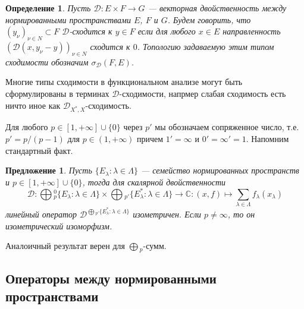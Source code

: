 \documentclass[12pt]{article}
\newtheorem{proposition}[theorem]{Предложение}
\newtheorem{definition}[theorem]{Определение}
\begin{document}
\begin{definition} Пусть $\mathcal{D}:E\times F\to G$ --- векторная двойственность между нормированными пространствами $E$, $F$ и $G$. Будем говорить, что $(y_\nu)_{\nu\in N}\subset F$ $\mathcal{D}$-сходится к $y\in F$ если для любого $x\in E$ направленность $(\mathcal{D}(x,y_\nu-y))_{\nu\in N}$ сходится к $0$. Топологию задаваемую этим типом сходимости обозначим $\sigma_\mathcal{D}(F,E)$.
\end{definition}

Многие типы сходимости в функциональном анализе могут быть сформулированы в терминах $\mathcal{D}$-сходимости, напрмер слабая сходимость есть ничто иное как $\mathcal{D}_{X^*,X}$-сходимость. 

Для любого $p\in[1,+\infty]\cup\{0\}$ через $p'$ мы обозначаем сопряженное число, т.е. $p'=p/(p-1)$ для $p\in(1,+\infty)$ причем $1'=\infty$ и $0'=\infty'=1$. Напомним стандартный факт.

\begin{proposition}\label{PrSumDuality}
Пусть $\{E_\lambda:\lambda\in \Lambda\}$ --- семейство нормированных пространств и $p\in[1,+\infty]\cup\{0\}$, тогда для скалярной двойственности
$$
\mathcal{D}:\bigoplus{}_p^0\{E_\lambda:\lambda\in \Lambda\}\times \bigoplus{}_{p'}\{E_\lambda^*:\lambda\in \Lambda\}\to \mathbb{C}: (x,f)\mapsto\sum\limits_{\lambda\in \Lambda} f_\lambda(x_\lambda)
$$
линейный оператор $\mathcal{D}^{\bigoplus{}_{p'}\{E_\lambda^*:\lambda\in \Lambda\}}$ изометричен. Если $p\neq\infty$, то он изометрический изоморфизм.
\end{proposition}

Аналоичный результат верен для $\bigoplus{}_p$-сумм.






















\subsection{Операторы между нормированными пространствами}
\end{document}
